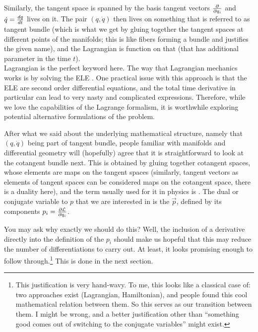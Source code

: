 \documentclass[../class_mech_main.tex]{subfiles}
\begin{document}
Similarly, the tangent space is spanned by the basis tangent vectors $\pdv{q_i}$ and $\dot{q} = \dv{q}{t}$ lives on it. The pair $(q, \dot{q})$ then lives on something that is referred to as tangent bundle (which is what we get by gluing together the tangent spaces at different points of the manifolds; this is like fibers forming a bundle and justifies the given name), and the Lagrangian is function on that (that has additional parameter in the time $t$).\\


Lagrangian is the perfect keyword here. The way that Lagrangian mechanics works is by solving the ELE . One practical issue with this approach is that the ELE are second order differential equations, and the total time derivative in particular can lead to very nasty and complicated expressions. Therefore, while we love the capabilities of the Lagrange formalism, it is worthwhile exploring potential alternative formulations of the problem.

After what we said about the underlying mathematical structure, namely that $(q, \dot{q})$ being part of tangent bundle, people familiar with manifolds and differential geometry will (hopefully) agree that it is straightforward to look at the cotangent bundle next. This is obtained by gluing together cotangent spaces, whose elements are maps on the tangent spaces (similarly, tangent vectors as elements of tangent spaces can be considered maps on the cotangent space, there is a duality here), and the term usually used for it in physics is . The dual or conjugate variable to $p$ that we are interested in is the  $\vec{p}$, defined by its components $p_i = \pdv{\mathcal{L}}{q_i}$. 


You may ask why exactly we should do this? Well, the inclusion of a derivative directly into the definition of the $p_i$ should make us hopeful that this may reduce the number of differentiations to carry out. At least, it looks promising enough to follow through.\footnote{This justification is very hand-wavy. To me, this looks like a classical case of: two approaches exist (Lagrangian, Hamiltonian), and people found this cool mathematical relation between them. So this serves as our transition between them. I might be wrong, and a better justification other than \enquote{something good comes out of switching to the conjugate variables} might exist.} This is done in the next section.
\end{document}

